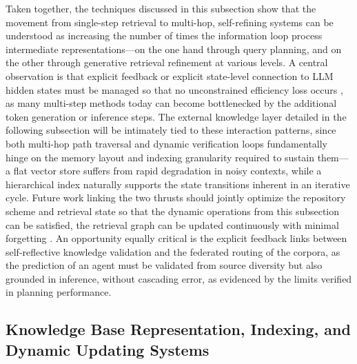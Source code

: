 \documentclass[11pt,a4paper]{article}
\begin{document}
Taken together, the techniques discussed in this subsection show that the movement from single-step retrieval to multi-hop, self-refining systems can be understood as increasing the number of times the information loop process intermediate representations---on the one hand through query planning, and on the other through generative retrieval refinement at various levels. A central observation is that explicit feedback or explicit state-level connection to LLM hidden states must be managed so that no unconstrained efficiency loss occurs \cite{arxiv:2511.05385v2}, as many multi-step methods today can become bottlenecked by the additional token generation or inference steps. The external knowledge layer detailed in the following subsection will be intimately tied to these interaction patterns, since both multi-hop path traversal and dynamic verification loops fundamentally hinge on the memory layout and indexing granularity required to sustain them---a flat vector store suffers from rapid degradation in noisy contexts, while a hierarchical index naturally supports the state transitions inherent in an iterative cycle. Future work linking the two thrusts should jointly optimize the repository scheme and retrieval state so that the dynamic operations from this subsection can be satisfied, the retrieval graph can be updated continuously with minimal forgetting \cite{arxiv:2512.20144v2}. An opportunity equally critical is the explicit feedback links between self-reflective knowledge validation and the federated routing of the corpora, as the prediction of an agent must be validated from source diversity but also grounded in inference, without cascading error, as evidenced by the limits verified in planning performance.


\subsection{Knowledge Base Representation, Indexing, and Dynamic Updating Systems}
\end{document}
